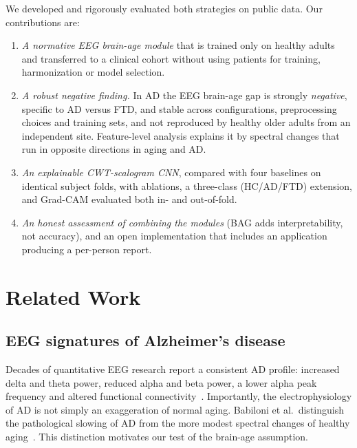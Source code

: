 \documentclass[journal]{IEEEtran}
\begin{document}
We developed and rigorously evaluated both strategies on public data. Our contributions are:
\begin{enumerate}
\item \emph{A normative EEG brain-age module} that is trained only on healthy adults and transferred to a clinical cohort without using patients for training, harmonization or model selection.
\item \emph{A robust negative finding.} In AD the EEG brain-age gap is strongly \emph{negative}, specific to AD versus FTD, and stable across configurations, preprocessing choices and training sets, and not reproduced by healthy older adults from an independent site. Feature-level analysis explains it by spectral changes that run in opposite directions in aging and AD.
\item \emph{An explainable CWT-scalogram CNN}, compared with four baselines on identical subject folds, with ablations, a three-class (HC/AD/FTD) extension, and Grad-CAM evaluated both in- and out-of-fold.
\item \emph{An honest assessment of combining the modules} (BAG adds interpretability, not accuracy), and an open implementation that includes an application producing a per-person report.
\end{enumerate}

\section{Related Work}
\subsection{EEG signatures of Alzheimer's disease}
Decades of quantitative EEG research report a consistent AD profile: increased delta and theta power, reduced alpha and beta power, a lower alpha peak frequency and altered functional connectivity~\cite{jeong2004,babiloni2020}. Importantly, the electrophysiology of AD is not simply an exaggeration of normal aging. Babiloni et al.\ distinguish the pathological slowing of AD from the more modest spectral changes of healthy aging~\cite{babiloni2020}. This distinction motivates our test of the brain-age assumption.
\end{document}
